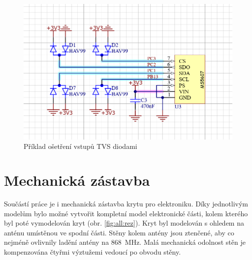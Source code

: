 \documentclass[twoside]{ctuthesis}
\theoremstyle{plain}
\theoremstyle{definition}
\theoremstyle{note}
\begin{document}
		\begin{figure}
			\centering
			\includegraphics[width = .55\textwidth]{Figures/osetreni_vstupu.png}
			\caption{Příklad ošetření vstupů TVS diodami}
			\label{fig:osetreni:vstupu}
		\end{figure}




	\section{Mechanická zástavba}
	Součástí práce je i mechanická zástavba krytu pro elektroniku. 
	Díky jednotlivým modelům bylo možné vytvořit kompletní model elektronické části, kolem kterého byl poté vymodelován kryt (obr. \ref{fig:all:rez}). Kryt byl modelován s ohledem na anténu umístěnou ve spodní části. Stěny kolem antény jsou ztenčené, aby co nejméně ovlivnily ladění antény na 868~MHz. Malá mechanická odolnost stěn je kompenzována čtyřmi výztužemi vedoucí po obvodu stěny.
\end{document}
